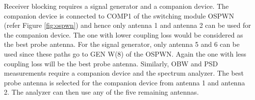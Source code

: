 Receiver blocking requires a signal generator and a companion device. The companion device is connected to COMP1 of the switching module OSPWN (refer Figure \ref{fig:ospwn}) and hence only antenna 1 and antenna 2 can be used for the companion device. The one with lower coupling loss would be considered as the best probe antenna. For the signal generator, only antenna 5 and 6 can be used since these paths go to GEN W(8) of the OSPWN. Again the one with less coupling loss will be the best probe antenna. Similarly, \acf{OBW} and \acf{PSD} measurements require a companion device and the spectrum analyzer. The best probe antenna is selected for the companion device from antenna 1 and antenna 2. The analyzer can then use any of the five remaining antennas.



















